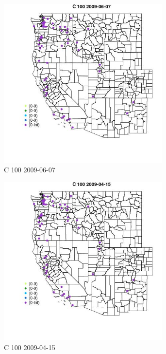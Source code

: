 \begin{figure} 
\centering  
\includegraphics[width=0.77\textwidth]{Code_Outputs/Report_ML_input_PM25_Step4_part_e_de_duplicated_aves_MapObsC_1002009-06-07.jpg} 
\caption{\label{fig:Report_ML_input_PM25_Step4_part_e_de_duplicated_avesMapObsC_1002009-06-07}C 100 2009-06-07} 
\end{figure} 
 

\begin{figure} 
\centering  
\includegraphics[width=0.77\textwidth]{Code_Outputs/Report_ML_input_PM25_Step4_part_e_de_duplicated_aves_MapObsC_1002009-04-15.jpg} 
\caption{\label{fig:Report_ML_input_PM25_Step4_part_e_de_duplicated_avesMapObsC_1002009-04-15}C 100 2009-04-15} 
\end{figure} 
 


